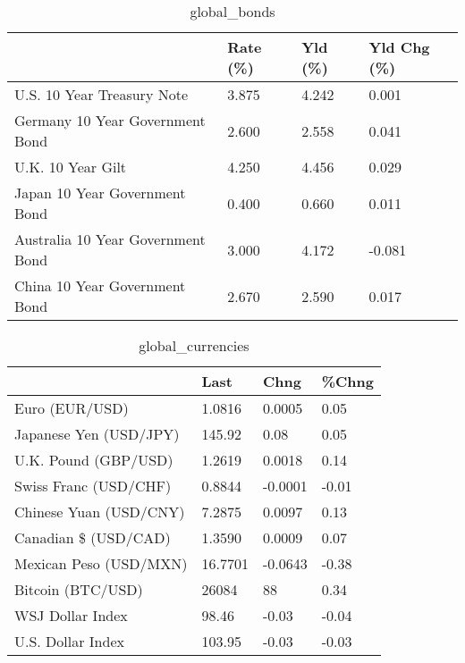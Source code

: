 \documentclass{article}%
\begin{document}
%


\begin{table}[htbp]%
\caption{global\_bonds}%
\centering%
\begin{adjustbox}{width=1\textwidth}%
\begin{tabular}{llll}
\toprule
                                  & Rate (\%) & Yld (\%) & Yld Chg (\%) \\
\midrule
       U.S. 10 Year Treasury Note &    3.875 &   4.242 &       0.001 \\
  Germany 10 Year Government Bond &    2.600 &   2.558 &       0.041 \\
                U.K. 10 Year Gilt &    4.250 &   4.456 &       0.029 \\
    Japan 10 Year Government Bond &    0.400 &   0.660 &       0.011 \\
Australia 10 Year Government Bond &    3.000 &   4.172 &      -0.081 \\
    China 10 Year Government Bond &    2.670 &   2.590 &       0.017 \\
\bottomrule
\end{tabular}
%
\end{adjustbox}%
\end{table}

%


\begin{table}[htbp]%
\caption{global\_currencies}%
\centering%
\begin{adjustbox}{width=1\textwidth}%
\begin{tabular}{llll}
\toprule
                       &    Last &    Chng & \%Chng \\
\midrule
        Euro (EUR/USD) &  1.0816 &  0.0005 &  0.05 \\
Japanese Yen (USD/JPY) &  145.92 &    0.08 &  0.05 \\
  U.K. Pound (GBP/USD) &  1.2619 &  0.0018 &  0.14 \\
 Swiss Franc (USD/CHF) &  0.8844 & -0.0001 & -0.01 \\
Chinese Yuan (USD/CNY) &  7.2875 &  0.0097 &  0.13 \\
  Canadian \$ (USD/CAD) &  1.3590 &  0.0009 &  0.07 \\
Mexican Peso (USD/MXN) & 16.7701 & -0.0643 & -0.38 \\
     Bitcoin (BTC/USD) &   26084 &      88 &  0.34 \\
      WSJ Dollar Index &   98.46 &   -0.03 & -0.04 \\
     U.S. Dollar Index &  103.95 &   -0.03 & -0.03 \\
\bottomrule
\end{tabular}
%
\end{adjustbox}%
\end{table}
\end{document}
